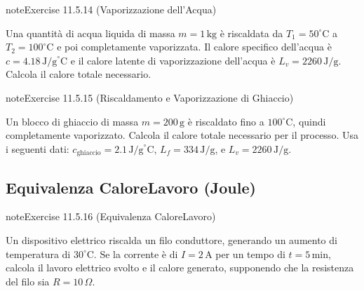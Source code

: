 \documentclass[letterpaper,10pt,italian]{jupyterBook}
\begin{document}
\begin{sphinxadmonition}{note}{Exercise 11.5.14 (Vaporizzazione dell’Acqua)}



\sphinxAtStartPar
Una quantità di acqua liquida di massa \(m = 1 \, \text{kg}\) è riscaldata da \(T_1 = 50^\circ \text{C}\) a \(T_2 = 100^\circ \text{C}\) e poi completamente vaporizzata. Il calore specifico dell’acqua è \(c = 4.18 \, \text{J/g}^\circ \text{C}\) e il calore latente di vaporizzazione dell’acqua è \(L_v = 2260 \, \text{J/g}\). Calcola il calore totale necessario.
\end{sphinxadmonition}
 \label{exercise:ch/thermodynamics/foundation-problems-exercise-14}

\begin{sphinxadmonition}{note}{Exercise 11.5.15 (Riscaldamento e Vaporizzazione di Ghiaccio)}



\sphinxAtStartPar
Un blocco di ghiaccio di massa \(m = 200 \, \text{g}\) è riscaldato fino a \(100^\circ \text{C}\), quindi completamente vaporizzato. Calcola il calore totale necessario per il processo. Usa i seguenti dati: \(c_{\text{ghiaccio}} = 2.1 \, \text{J/g}^\circ \text{C}\), \(L_f = 334 \, \text{J/g}\), e \(L_v = 2260 \, \text{J/g}\).
\end{sphinxadmonition}


\subsection{Equivalenza Calore\sphinxhyphen{}Lavoro (Joule)}
\label{\detokenize{ch/thermodynamics/foundation-problems:equivalenza-calore-lavoro-joule}} \label{exercise:ch/thermodynamics/foundation-problems-exercise-15}

\begin{sphinxadmonition}{note}{Exercise 11.5.16 (Equivalenza Calore\sphinxhyphen{}Lavoro)}



\sphinxAtStartPar
Un dispositivo elettrico riscalda un filo conduttore, generando un aumento di temperatura di \(30^\circ \text{C}\). Se la corrente è di \(I = 2 \, \text{A}\) per un tempo di \(t = 5 \, \text{min}\), calcola il lavoro elettrico svolto e il calore generato, supponendo che la resistenza del filo sia \(R = 10 \, \Omega\).
\end{sphinxadmonition}
 \label{exercise:ch/thermodynamics/foundation-problems-exercise-16}
\end{document}
